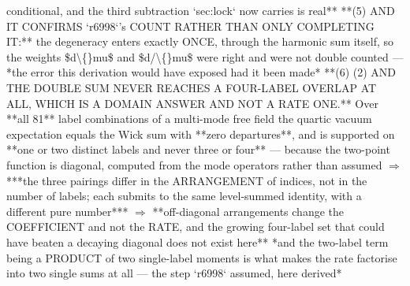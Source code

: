 \begin{description}
conditional, and the third subtraction `sec:lock` now carries is real**  **(5) AND IT CONFIRMS `r6998`'s COUNT RATHER THAN ONLY COMPLETING IT:** the degeneracy enters exactly ONCE, through the harmonic sum itself, so the weights \$d\textbackslash\{\}mu\$ and \$d/\textbackslash\{\}mu\$ were right and were not double counted --- *the error this derivation would have exposed had it been made*  **(6)  (2) AND THE DOUBLE SUM NEVER REACHES A FOUR-LABEL OVERLAP AT ALL, WHICH IS A DOMAIN ANSWER AND NOT A RATE ONE.** Over **all 81** label combinations of a multi-mode free field the quartic vacuum expectation equals the Wick sum with **zero departures**, and is supported on **one or two distinct labels and never three or four** --- because the two-point function is diagonal, computed from the mode operators rather than assumed \ensuremath{\Rightarrow} ***the three pairings differ in the ARRANGEMENT of indices, not in the number of labels; each submits to the same level-summed identity, with a different pure number*** \ensuremath{\Rightarrow} **off-diagonal arrangements change the COEFFICIENT and not the RATE, and the growing four-label set that could have beaten a decaying diagonal does not exist here**  *and the two-label term being a PRODUCT of two single-label moments is what makes the rate factorise into two single sums at all --- the step `r6998` assumed, here derived*

\end{description}
